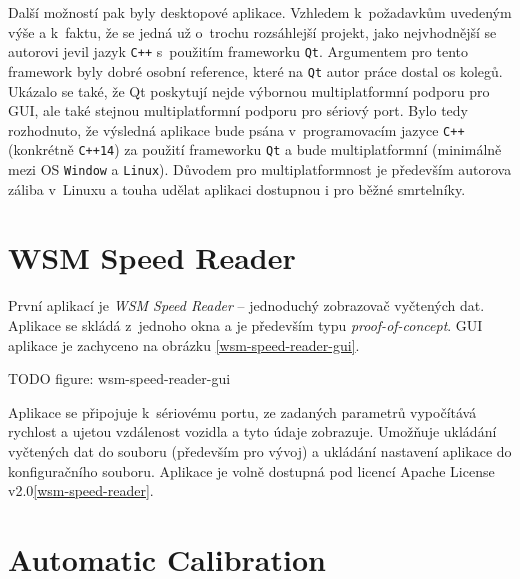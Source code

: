 Další možností pak byly desktopové aplikace. Vzhledem k~požadavkům uvedeným
výše a k~faktu, že se jedná už o~trochu rozsáhlejší projekt, jako nejvhodnější
se autorovi jevil jazyk \texttt{C++} s~použitím frameworku \texttt{Qt}.
Argumentem pro tento framework byly dobré osobní reference, které na
\texttt{Qt} autor práce dostal os kolegů. Ukázalo se také, že Qt poskytují
nejde výbornou multiplatformní podporu pro GUI, ale také stejnou
multiplatformní podporu pro sériový port. Bylo tedy rozhodnuto, že výsledná
aplikace bude psána v~programovacím jazyce \texttt{C++} (konkrétně
\texttt{C++14}) za použití frameworku \texttt{Qt} a bude multiplatformní
(minimálně mezi OS \texttt{Window} a \texttt{Linux}). Důvodem pro
multiplatformnost je především autorova záliba v~Linuxu a touha udělat aplikaci
dostupnou i pro běžné smrtelníky.

\section{WSM Speed Reader}
\label{sec:sw-wsm-speed-reader}

První aplikací je \textit{WSM Speed Reader} -- jednoduchý zobrazovač vyčtených
dat. Aplikace se skládá z~jednoho okna a je především typu
\textit{proof-of-concept}. GUI aplikace je zachyceno na obrázku
\ref{wsm-speed-reader-gui}.

TODO figure: wsm-speed-reader-gui

Aplikace se připojuje k~sériovému portu, ze zadaných parametrů vypočítává
rychlost a ujetou vzdálenost vozidla a tyto údaje zobrazuje. Umožňuje ukládání
vyčtených dat do souboru (především pro vývoj) a ukládání nastavení aplikace
do konfiguračního souboru. Aplikace je volně dostupná pod licencí Apache
License v2.0\ref{wsm-speed-reader}.

\section{Automatic Calibration}
\label{sec:sw-wsm-auto-calib}

